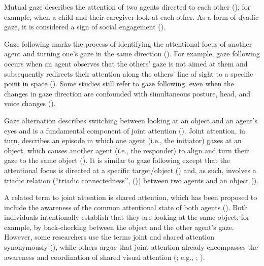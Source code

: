 \documentclass[
]{scrbook}
\begin{document}
Mutual gaze describes the attention of two agents directed to each other (); for example, when a child and their caregiver look at each other. As a form of dyadic gaze, it is considered a sign of social engagement ().

Gaze following marks the process of identifying the attentional focus of another agent and turning one's gaze in the same direction (). For example, gaze following occurs when an agent observes that the others' gaze is not aimed at them and subsequently redirects their attention along the others' line of sight to a specific point in space (). Some studies still refer to gaze following, even when the changes in gaze direction are confounded with simultaneous posture, head, and voice changes ().

Gaze alternation describes switching between looking at an object and an agent's eyes and is a fundamental component of joint attention (). Joint attention, in turn, describes an episode in which one agent (i.e., the initiator) gazes at an object, which causes another agent (i.e., the responder) to align and turn their gaze to the same object (). It is similar to gaze following except that the attentional focus is directed at a specific target/object () and, as such, involves a triadic relation (``triadic connectedness'', ()) between two agents and an object ().

A related term to joint attention is shared attention, which has been proposed to include the awareness of the common attentional state of both agents (). Both individuals intentionally establish that they are looking at the same object; for example, by back-checking between the object and the other agent's gaze. However, some researchers use the terms joint and shared attention synonymously (), while others argue that joint attention already encompasses the awareness and coordination of shared visual attention (; e.g., ; ).
\end{document}
